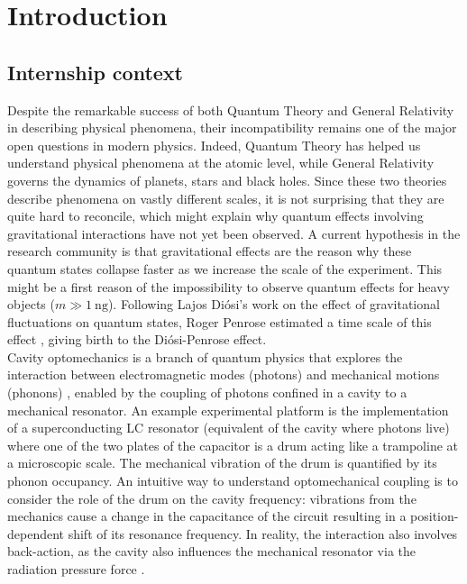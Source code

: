 \documentclass[11pt,a4pape,longbibliography]{article}
\begin{document}
\newpage

\tableofcontents

\newpage

\newpage

\section{Introduction}

\subsection{Internship context}

Despite the remarkable success of both Quantum Theory and General Relativity in describing physical phenomena, their incompatibility remains one of the major open questions in modern physics. Indeed, Quantum Theory has helped us understand physical phenomena at the atomic level, while General Relativity governs the dynamics of planets, stars and black holes. Since these two theories describe phenomena on vastly different scales, it is not surprising that they are quite hard to reconcile, which might explain why quantum effects involving gravitational interactions have not yet been observed. A current hypothesis in the research community is that gravitational effects are the reason why these quantum states collapse faster as we increase the scale of the experiment. This might be a first reason of the impossibility to observe quantum effects for heavy objects ($m\gg\SI{1}{\ng}$). Following Lajos Di\'osi's work \cite{diosi_universal_1987} on the effect of gravitational fluctuations on quantum states, Roger Penrose estimated a time scale of this effect \cite{hameroff_consciousness_2014}, giving birth to the Di\'osi-Penrose effect.\\

Cavity optomechanics is a branch of quantum physics that explores the interaction between electromagnetic modes (photons) and mechanical motions (phonons) \cite{aspelmeyer_cavity_2014}, enabled by the coupling of photons confined in a cavity to a mechanical resonator. An example experimental platform is the implementation of a superconducting LC resonator (equivalent of the cavity where photons live) where one of the two plates of the capacitor is a drum acting like a trampoline at a microscopic scale.  The mechanical vibration of the drum is quantified by its phonon occupancy. An intuitive way to understand optomechanical coupling is to consider the role of the drum on the cavity frequency: vibrations from the mechanics cause a change in the capacitance of the circuit resulting in a position-dependent shift of its resonance frequency. In reality, the interaction also involves back-action, as the cavity also influences the mechanical resonator via the radiation pressure force \cite{aspelmeyer_cavity_2014}.
\end{document}
